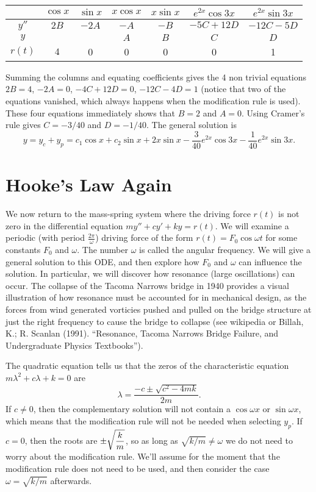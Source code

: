 \begin{example}
\begin{center}
\begin{tabular}{c|c|c|c|c|c|c|}
&$\cos x$ & $\sin x$ &$x\cos x$ & $x\sin x$ & $e^{2x}\cos 3x$ & $e^{2x}\sin 3x$\\\hline\hline
$y''$&$2B$ & $-2A$ &$-A$ & $-B$ & $-5C+12D$ & $-12C-5D$\\
$y$& &  &$A$ & $B$ & $C$ & $D$\\\hline
$r(t)$&$4$ & 0 & 0& 0 & 0 & 1\\
\end{tabular}
\end{center}
Summing the columns and equating coefficients gives the 4 non trivial equations $2B=4$, $-2A=0$, $-4C+12D=0$, $-12C-4D=1$ (notice that two of the equations vanished, which always happens when the modification rule is used).  These four equations immediately shows that $B=2$ and $A=0$. Using Cramer's rule gives $C=-3/40$ and $D=-1/40$. The general solution is $$y=y_c+y_p= c_1\cos x +c_2\sin x+2x\sin x -\frac{3}{40}e^{2x}\cos 3x-\frac{1}{40} e^{2x} \sin 3x.$$
\end{example}






\section{Hooke's Law Again}
We now return to the mass-spring system where the driving force $r(t)$ is not zero in the differential equation $my''+cy'+ky=r(t)$. We will examine a periodic (with period $\frac{2\pi}{\omega}$) driving force of the form $r(t)=F_0\cos \omega t$ for some constants $F_0$ and $\omega$. The number $\omega$ is called the angular frequency. We will give a general solution to this ODE, and then explore how $F_0$ and $\omega$ can influence the solution.  In particular, we will discover how resonance (large oscillations) can occur. The collapse of the Tacoma Narrows bridge in 1940 provides a visual illustration of how resonance must be accounted for in mechanical design, as the forces from wind generated vorticies pushed and pulled on the bridge structure at just the right frequency to cause the bridge to collapse ({\footnotesize see wikipedia or Billah, K.; R. Scanlan (1991). ``Resonance, Tacoma Narrows Bridge Failure, and Undergraduate Physics Textbooks''}). 

The quadratic equation tells us that the zeros of the characteristic equation $m\lambda^2+c\lambda+k=0$ are 
$$\lambda = \frac{-c\pm \sqrt{c^2-4mk}}{2m}.$$
If $c\neq 0$, then the complementary solution will not contain a $\cos \omega x$ or $\sin \omega x$, which means that the modification rule will not be needed when selecting $y_p$. If $c=0$, then the roots are $\displaystyle\pm\sqrt{\frac{k}{m}}$, so as long as $\sqrt{k/m}\neq \omega$ we do not need to worry about the modification rule.  We'll assume for the moment that the modification rule does not need to be used, and then consider the case $\omega=\sqrt{k/m}$ afterwards.

